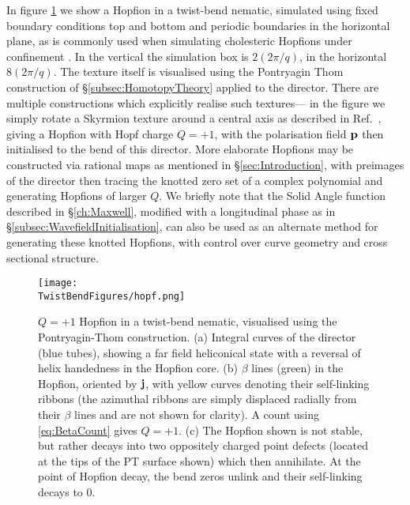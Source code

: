 {In figure \ref{fig:Hopf} we show a Hopfion in a twist-bend nematic, simulated using fixed boundary conditions top and bottom and periodic boundaries in the horizontal plane, as is commonly used when simulating cholesteric Hopfions under confinement \citep{Ackerman2017}. In the vertical the simulation box is $2(2\pi/q)$, in the horizontal $8(2\pi/q)$. The texture itself is visualised using the Pontryagin Thom construction of \S\ref{subsec:HomotopyTheory} applied to the director. There are multiple constructions which explicitly realise such textures--- in the figure we simply rotate a Skyrmion texture around a central axis as described in Ref.~\citep{Sutcliffe2007}, giving a Hopfion with Hopf charge $Q=+1$, with the polarisation field $\mathbf{p}$  then initialised to the bend of this director. More elaborate Hopfions may be constructed via rational maps \citep{Sutcliffe2007} as mentioned in \S\ref{sec:Introduction}, with preimages of the director then tracing the knotted zero set of a complex polynomial and generating Hopfions of larger $Q$. We briefly note that the Solid Angle function described in \S\ref{ch:Maxwell}, modified with a longitudinal phase as in \S\ref{subsec:WavefieldInitialisation}, can also be used as an alternate method for generating these knotted Hopfions, with control over curve geometry and cross sectional structure. 
\begin{figure}[htbp]
    \centering
    \texttt{[image: \\TwistBendFigures/hopf.png]}
    \caption[Hopfion in a twist-bend nematic.]{$Q=+1$ Hopfion in a twist-bend nematic, visualised using the Pontryagin-Thom construction. (a) Integral curves of the director (blue tubes), showing a far field heliconical state with a reversal of helix handedness in the Hopfion core. (b) $\beta$ lines (green) in the Hopfion, oriented by $\mathbf{j}$, with yellow curves denoting their self-linking ribbons (the azimuthal ribbons are simply displaced radially from their $\beta$ lines and are not shown for clarity). A count using \eqref{eq:BetaCount} gives $Q=+1$. (c) The Hopfion shown is not stable, but rather decays into two oppositely charged point defects (located at the tips of the PT surface shown) which then annihilate.  At the point of Hopfion decay, the bend zeros unlink and their self-linking decays to $0$.}
    \label{fig:Hopf}
\end{figure}

}
